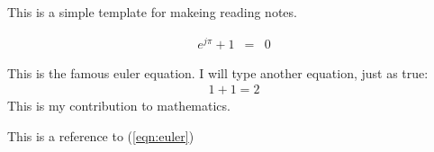 \documentclass[letterpaper]{article}
\begin{document}
This is a simple template for makeing reading notes.

\begin{eqnarray}
  \label{eqn:euler}
  e^{j\pi} + 1 &=& 0
\end{eqnarray}

This is the famous euler equation. I will type another equation, just as true:
\begin{eqnarray}
  \label{eqn:simple}
  1 + 1 = 2
\end{eqnarray}
This is my contribution to mathematics.

This is a reference to (\ref{eqn:euler})
\end{document}
